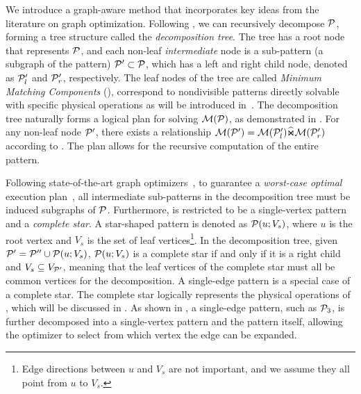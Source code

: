 We introduce a graph-aware method that incorporates key ideas from the literature on graph optimization. Following , we can recursively decompose $\mathcal{P}$, forming a tree structure called the \emph{decomposition tree}. The tree has a root node that represents $\mathcal{P}$, and each non-leaf \emph{intermediate} node is a sub-pattern (a subgraph of the pattern) $\mathcal{P}' \subset \mathcal{P}$, which has a left and right child node, denoted as $\mathcal{P}'_l$ and $\mathcal{P}'_r$, respectively. %
The leaf nodes of the tree are called \emph{Minimum Matching Components} (\mmc), correspond to nondivisible patterns directly solvable with specific physical operations
as will be introduced in~. The decomposition tree naturally forms a logical plan for solving $\mathcal{M}(\mathcal{P})$, as demonstrated in . For any non-leaf node $\mathcal{P}'$, there exists a relationship $\mathcal{M}(\mathcal{P}') = \mathcal{M}(\mathcal{P}'_l) \widehat{\Join} \mathcal{M}(\mathcal{P}'_r)$ according to . The plan allows for the recursive computation of the entire pattern.

Following state-of-the-art graph optimizers~\cite{huge,GLogS}, to guarantee a \emph{worst-case optimal} execution plan~\cite{ngo2018worst}, all intermediate sub-patterns in the decomposition tree must be induced subgraphs of $\mathcal{P}$. Furthermore, \mmc is restricted to be a single-vertex pattern and a \emph{complete star}. A star-shaped pattern is denoted as $\mathcal{P}(u;V_s)$, where $u$ is the root vertex and $V_s$ is the set of leaf vertices\footnote{Edge directions between $u$ and $V_s$ are not important, and we assume they all point from $u$ to $V_s$.}. In the decomposition tree, given $\mathcal{P}' = \mathcal{P}'' \cup \mathcal{P}(u;V_s)$, $\mathcal{P}(u;V_s)$ is a complete star if and only if it is a right child and $V_s \subseteq V_{\mathcal{P}'}$, meaning that the leaf vertices of the complete star must all be common vertices for the decomposition. A single-edge pattern is a special case of a complete star. The complete star logically represents the physical operations of \expandintersect, which will be discussed in . As shown in , a single-edge pattern, such as $\mathcal{P}_3$, is further decomposed into a single-vertex pattern and the pattern itself, allowing the optimizer to select from which vertex the edge can be expanded.



